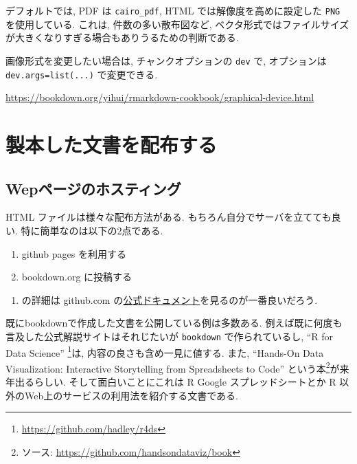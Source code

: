 \documentclass[
  nomag]{bxjsbook}
\providecommand{\tightlist}{%
  \setlength{\itemsep}{0pt}\setlength{\parskip}{0pt}}
\theoremstyle{definition}
\theoremstyle{definition}
\theoremstyle{definition}
\theoremstyle{remark}
\begin{document}
デフォルトでは, PDF は \texttt{cairo\_pdf}, HTML
では解像度を高めに設定した \texttt{PNG} を使用している. これは,
件数の多い散布図など,
ベクタ形式ではファイルサイズが大きくなりすぎる場合もありうるための判断である.

画像形式を変更したい場合は, チャンクオプションの \texttt{dev} で,
オプションは \texttt{dev.args=list(...)} で変更できる.

\url{https://bookdown.org/yihui/rmarkdown-cookbook/graphical-device.html}

\hypertarget{ux88fdux672cux3057ux305fux6587ux66f8ux3092ux914dux5e03ux3059ux308b}{%
\chapter{製本した文書を配布する}\label{ux88fdux672cux3057ux305fux6587ux66f8ux3092ux914dux5e03ux3059ux308b}}

\hypertarget{wepux30daux30fcux30b8ux306eux30dbux30b9ux30c6ux30a3ux30f3ux30b0}{%
\section{Wepページのホスティング}\label{wepux30daux30fcux30b8ux306eux30dbux30b9ux30c6ux30a3ux30f3ux30b0}}

HTML ファイルは様々な配布方法がある. もちろん自分でサーバを立てても良い.
特に簡単なのは以下の2点である.

\begin{enumerate}
\def\labelenumi{\arabic{enumi}.}
\tightlist
\item
  github pages を利用する
\item
  bookdown.org に投稿する
\end{enumerate}

\begin{enumerate}
\def\labelenumi{(\arabic{enumi})}
\tightlist
\item
  の詳細は github.com
  の\href{https://docs.github.com/ja/github/working-with-github-pages/about-github-pages}{公式ドキュメント}を見るのが一番良いだろう.
\end{enumerate}

既にbookdownで作成した文書を公開している例は多数ある.
例えば既に何度も言及した公式解説サイトはそれじたいが \texttt{bookdown}
で作られているし, ``R for Data Science'' \autocite{wickham2016Data}
\footnote{\url{https://github.com/hadley/r4ds}}は,
内容の良さも含め一見に値する. また, ``Hands-On Data Visualization:
Interactive Storytelling from Spreadsheets to Code''
\autocite{doughertyforthcomingHandsOn}
という本\footnote{ソース: \url{https://github.com/handsondataviz/book}}が来年出るらしい.
そして面白いことにこれは R Google スプレッドシートとか R
以外のWeb上のサービスの利用法を紹介する文書である.
\end{document}
